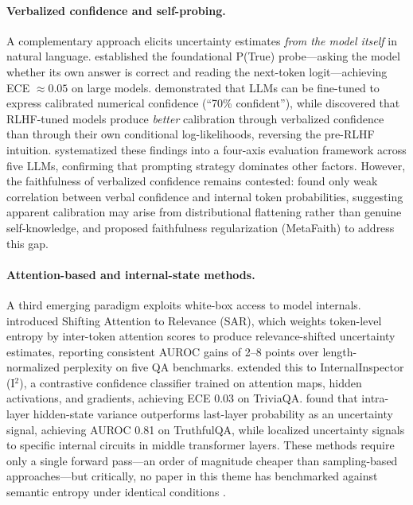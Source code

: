 \paragraph{Verbalized confidence and self-probing.}
A complementary approach elicits uncertainty estimates \emph{from the model itself} in natural language. \citet{KadavathEtAl2022} established the foundational P(True) probe---asking the model whether its own answer is correct and reading the next-token logit---achieving ECE ${\approx} 0.05$ on large models. \citet{LinEtAl2022} demonstrated that LLMs can be fine-tuned to express calibrated numerical confidence (``70\% confident''), while \citet{TianEtAl2023} discovered that RLHF-tuned models produce \emph{better} calibration through verbalized confidence than through their own conditional log-likelihoods, reversing the pre-RLHF intuition. \citet{XiongEtAl2023} systematized these findings into a four-axis evaluation framework across five LLMs, confirming that prompting strategy dominates other factors. However, the faithfulness of verbalized confidence remains contested: \citet{KumarEtAl2024} found only weak correlation between verbal confidence and internal token probabilities, suggesting apparent calibration may arise from distributional flattening rather than genuine self-knowledge, and \citet{LiuEtAl2025a} proposed faithfulness regularization (MetaFaith) to address this gap.

\paragraph{Attention-based and internal-state methods.}
A third emerging paradigm exploits white-box access to model internals. \citet{DuanEtAl2023} introduced Shifting Attention to Relevance (SAR), which weights token-level entropy by inter-token attention scores to produce relevance-shifted uncertainty estimates, reporting consistent AUROC gains of 2--8 points over length-normalized perplexity on five QA benchmarks. \citet{BeigiEtAl2024} extended this to InternalInspector (I$^2$), a contrastive confidence classifier trained on attention maps, hidden activations, and gradients, achieving ECE 0.03 on TriviaQA. \citet{BadashEtAl2026} found that intra-layer hidden-state variance outperforms last-layer probability as an uncertainty signal, achieving AUROC 0.81 on TruthfulQA, while \citet{GhasemabadiNiu2025} localized uncertainty signals to specific internal circuits in middle transformer layers. These methods require only a single forward pass---an order of magnitude cheaper than sampling-based approaches---but critically, no paper in this theme has benchmarked against semantic entropy under identical conditions \cite{GengEtAl2023}.

